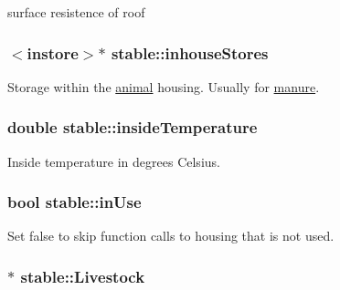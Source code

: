surface resistence of roof \hypertarget{classstable_ad827c2a4881390861ed8dc4ebc4358b9}{
\subsubsection[{inhouseStores}]{$<${\bf instore}$>$$\ast$ {\bf stable::inhouseStores}}}
\label{classstable_ad827c2a4881390861ed8dc4ebc4358b9}


Storage within the \hyperlink{classanimal}{animal} housing. Usually for \hyperlink{classmanure}{manure}. \hypertarget{classstable_a69b1f4500abb6928a09ecd21cd292c76}{
\subsubsection[{insideTemperature}]{\setlength{\rightskip}{0pt plus 5cm}double {\bf stable::insideTemperature}}}
\label{classstable_a69b1f4500abb6928a09ecd21cd292c76}


Inside temperature in degrees Celsius. \hypertarget{classstable_a98595703d682fc7a073100f8eb04f8fc}{
\subsubsection[{inUse}]{\setlength{\rightskip}{0pt plus 5cm}bool {\bf stable::inUse}}}
\label{classstable_a98595703d682fc7a073100f8eb04f8fc}


Set false to skip function calls to housing that is not used. \hypertarget{classstable_ada5b39b9185fc598fda42e04cda311e3}{
\subsubsection[{Livestock}]{$\ast$ {\bf stable::Livestock}}}
\label{classstable_ada5b39b9185fc598fda42e04cda311e3}


